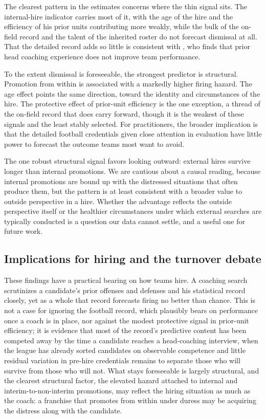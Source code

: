 \documentclass[USenglish]{article}
\theoremstyle{dgthm}
\theoremstyle{dgdef}
\begin{document}
The clearest pattern in the estimates concerns where the thin signal sits. The internal-hire indicator carries most of it, with the age of the hire and the efficiency of his prior units contributing more weakly, while the bulk of the on-field record and the talent of the inherited roster do not forecast dismissal at all. That the detailed record adds so little is consistent with \citet{roach2016}, who finds that prior head coaching experience does not improve team performance.

To the extent dismissal is foreseeable, the strongest predictor is structural. Promotion from within is associated with a markedly higher firing hazard. The age effect points the same direction, toward the identity and circumstances of the hire. The protective effect of prior-unit efficiency is the one exception, a thread of the on-field record that does carry forward, though it is the weakest of these signals and the least stably selected. For practitioners, the broader implication is that the detailed football credentials given close attention in evaluation have little power to forecast the outcome teams most want to avoid.

The one robust structural signal favors looking outward: external hires survive longer than internal promotions. We are cautious about a causal reading, because internal promotions are bound up with the distressed situations that often produce them, but the pattern is at least consistent with a broader value to outside perspective in a hire. Whether the advantage reflects the outside perspective itself or the healthier circumstances under which external searches are typically conducted is a question our data cannot settle, and a useful one for future work.

\subsection{Implications for hiring and the turnover debate}

These findings have a practical bearing on how teams hire. A coaching search scrutinizes a candidate's prior offenses and defenses and his statistical record closely, yet as a whole that record forecasts firing no better than chance. This is not a case for ignoring the football record, which plausibly bears on performance once a coach is in place, nor against the modest protective signal in prior-unit efficiency; it is evidence that most of the record's predictive content has been competed away by the time a candidate reaches a head-coaching interview, when the league has already sorted candidates on observable competence and little residual variation in pre-hire credentials remains to separate those who will survive from those who will not. What stays foreseeable is largely structural, and the clearest structural factor, the elevated hazard attached to internal and interim-to-non-interim promotions, may reflect the hiring situation as much as the coach: a franchise that promotes from within under duress may be acquiring the distress along with the candidate.
\end{document}
